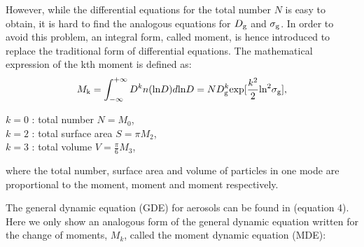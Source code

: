 \documentclass[12pt, fullpage]{uiucthesis2009}
\begin{document}
		However, while the differential equations for the total number $N$ is easy to obtain, it is hard to find the analogous equations for $D_{\rm g}$ and $\sigma_{\rm g}$. In order to avoid this problem, an integral form, called moment, is hence introduced to replace the traditional form of differential equations. The mathematical expression of the kth moment is defined as:
		\begin{align}
		M_\text{k} = \int_{-\infty}^{+\infty}D^kn(\text{ln}D)d\text{ln}D = ND_{\rm g}^k\text{exp}[\frac{k^2}{2}\text{ln}^2\sigma_{\rm g}],
		\end{align}
		\begin{flushleft}
			$k = 0$ : total number $N = M_0$, \\
			$k = 2$ : total surface area $S = \pi M_2$, \\
			$k = 3$ : total volume $V = \frac{\pi}{6}M_3$, \\
		\end{flushleft}
		where the total number, surface area and volume of particles in one mode are proportional to the  moment,  moment and  moment respectively. 
		
		The general dynamic equation (GDE) for aerosols can be found in \citet{whitby1997} (equation 4). Here we only show an analogous form of the general dynamic equation written for the change of moments, $M_{k}$, called the moment dynamic equation (MDE):
		
\end{document}
